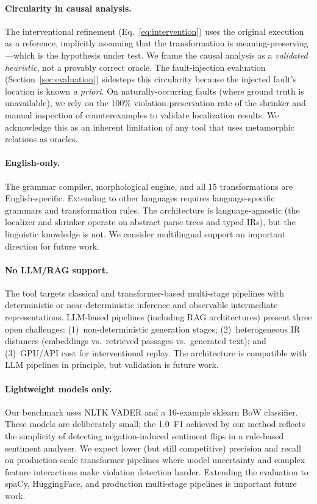 \documentclass[sigconf,nonacm]{acmart}
\begin{document}
\paragraph{Circularity in causal analysis.}
The interventional refinement (Eq.~\ref{eq:intervention}) uses the original execution as a reference, implicitly assuming that the transformation is meaning-preserving---which is the hypothesis under test.
We frame the causal analysis as a \emph{validated heuristic}, not a provably correct oracle.
The fault-injection evaluation (Section~\ref{sec:evaluation}) sidesteps this circularity because the injected fault's location is known \emph{a priori}.
On naturally-occurring faults (where ground truth is unavailable), we rely on the 100\% violation-preservation rate of the shrinker and manual inspection of counterexamples to validate localization results.
We acknowledge this as an inherent limitation of any tool that uses metamorphic relations as oracles.

\paragraph{English-only.}
The grammar compiler, morphological engine, and all 15 transformations are English-specific.
Extending to other languages requires language-specific grammars and transformation rules.
The architecture is language-agnostic (the localizer and shrinker operate on abstract parse trees and typed IRs), but the linguistic knowledge is not.
We consider multilingual support an important direction for future work.

\paragraph{No LLM/RAG support.}
The tool targets classical and transformer-based multi-stage pipelines with deterministic or near-deterministic inference and observable intermediate representations.
LLM-based pipelines (including RAG architectures) present three open challenges: (1)~non-deterministic generation stages; (2)~heterogeneous IR distances (embeddings vs.\ retrieved passages vs.\ generated text); and (3)~GPU/API cost for interventional replay.
The architecture is compatible with LLM pipelines in principle, but validation is future work.

\paragraph{Lightweight models only.}
Our benchmark uses NLTK VADER and a 16-example sklearn BoW classifier.
These models are deliberately small; the 1.0~F1 achieved by our method reflects the simplicity of detecting negation-induced sentiment flips in a rule-based sentiment analyser.
We expect lower (but still competitive) precision and recall on production-scale transformer pipelines where model uncertainty and complex feature interactions make violation detection harder.
Extending the evaluation to spaCy, HuggingFace, and production multi-stage pipelines is important future work.
\end{document}
